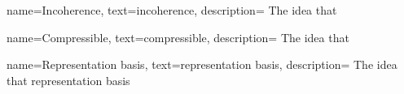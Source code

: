 {
name={Incoherence},
text={incoherence},
description={ The idea that }
}

{
name={Compressible},
text={compressible},
description={ The idea that }
}

{
name={Representation basis},
text={representation basis},
description={ The idea that representation basis}
}